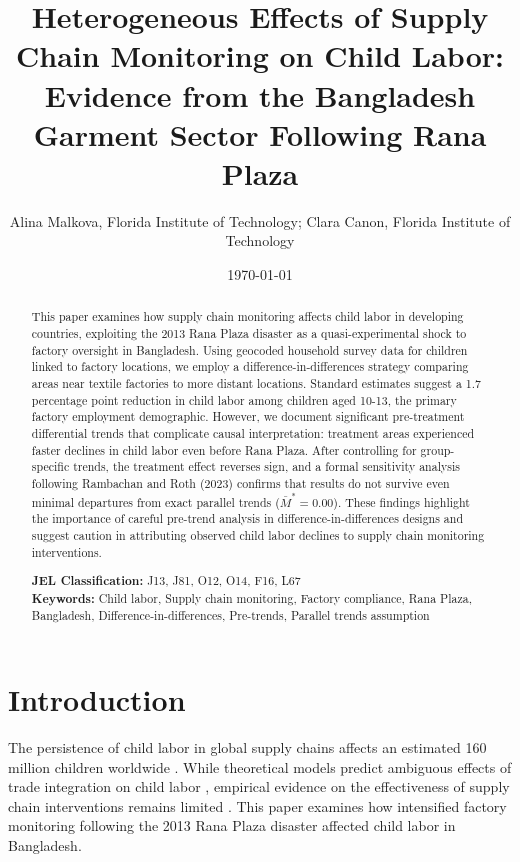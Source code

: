 \documentclass[12pt]{article}
\title{Heterogeneous Effects of Supply Chain Monitoring on Child Labor: Evidence from the Bangladesh Garment Sector Following Rana Plaza}
\author{Alina Malkova, Florida Institute of Technology;  Clara Canon, Florida Institute of Technology }
\date{\today}
\begin{document}
\maketitle

\begin{abstract}
\noindent This paper examines how supply chain monitoring affects child labor in developing countries, exploiting the 2013 Rana Plaza disaster as a quasi-experimental shock to factory oversight in Bangladesh. Using geocoded household survey data for children linked to factory locations, we employ a difference-in-differences strategy comparing areas near textile factories to more distant locations. Standard estimates suggest a 1.7 percentage point reduction in child labor among children aged 10-13, the primary factory employment demographic. However, we document significant pre-treatment differential trends that complicate causal interpretation: treatment areas experienced faster declines in child labor even before Rana Plaza. After controlling for group-specific trends, the treatment effect reverses sign, and a formal sensitivity analysis following Rambachan and Roth (2023) confirms that results do not survive even minimal departures from exact parallel trends ($\bar{M}^* = 0.00$). These findings highlight the importance of careful pre-trend analysis in difference-in-differences designs and suggest caution in attributing observed child labor declines to supply chain monitoring interventions.

\vspace{0.5cm}
\noindent \textbf{JEL Classification:} J13, J81, O12, O14, F16, L67\\
\textbf{Keywords:} Child labor, Supply chain monitoring, Factory compliance, Rana Plaza, Bangladesh, Difference-in-differences, Pre-trends, Parallel trends assumption
\end{abstract}

\clearpage

\section{Introduction}

The persistence of child labor in global supply chains affects an estimated 160 million children worldwide \citep{ilo2021global}. While theoretical models predict ambiguous effects of trade integration on child labor \citep{edmonds2005child, basu1998economics, baland2000child}, empirical evidence on the effectiveness of supply chain interventions remains limited \citep{edmonds2020globalization}. This paper examines how intensified factory monitoring following the 2013 Rana Plaza disaster affected child labor in Bangladesh.
\end{document}
